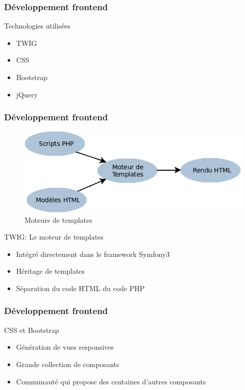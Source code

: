 \speaker{\Juliana}

\begin{frame}
\frametitle{Développement frontend}
\begin{block}{Technologies utilisées}
	\begin{itemize}
		\item TWIG
		\item CSS
		\item Bootstrap
		\item jQuery
	\end{itemize}
\end{block}
\end{frame}

\begin{frame}
\frametitle{Développement frontend}



      \begin{figure}[r]
		\includegraphics[scale=0.3]{images/moteursTemp.png}
		\caption{Moteurs de templates}
	  \end{figure}
\begin{block}{TWIG: Le moteur de templates }
	
		\begin{itemize}
			\item Intégré directement dans le framework Symfony3
			\item Héritage de templates
			\item Séparation du code HTML du code PHP
		\end{itemize}
\end{block}
\end{frame}

\begin{frame}
\frametitle{Développement frontend}
\begin{block}{ CSS et Bootstrap }
	\begin{itemize}
		\item Génération de vues responsives
		\item Grande collection de composants
		\item Communauté qui propose des centaines d'autres composants
	\end{itemize}
\end{block}
\end{frame}

